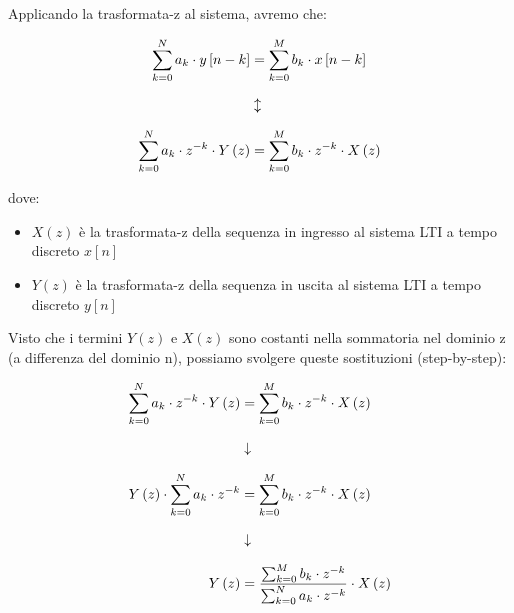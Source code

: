 Applicando la trasformata-z al sistema, avremo che: 

{
    \Large 
    \begin{equation}
        \setlength{\jot}{10pt} %
        \begin{split}
        \sum_{k = 0}^{N}
        a_k \cdot y \left[ n - k\right]
        &= 
        \sum_{k = 0}^{M}
        b_k \cdot x \left[ n - k\right]
        \\
        &\updownarrow
        \\
        \sum_{k = 0}^{N}
        a_k \cdot z^{-k} \cdot Y \left( z\right)
        &= 
        \sum_{k = 0}^{M}
        b_k \cdot z^{-k} \cdot X \left( z\right)
        \end{split}
    \end{equation}
}

dove: 

\begin{itemize}
    \item $X \left( z\right)$ è la trasformata-z della sequenza in ingresso al sistema LTI a tempo discreto $x \left[ n\right]$
    \item $Y \left( z\right)$ è la trasformata-z della sequenza in uscita al sistema LTI a tempo discreto $y \left[ n\right]$
\end{itemize} 

\newpage 

Visto che i termini $Y \left( z\right)$ e $X \left( z\right)$ sono costanti nella sommatoria nel dominio z (a differenza del dominio n), 
possiamo svolgere queste sostituzioni (step-by-step):

{
    \Large 
    \begin{equation}
        \setlength{\jot}{10pt} %
        \begin{split}
        \sum_{k = 0}^{N}
        a_k \cdot z^{-k} \cdot Y \left( z\right)
        &= 
        \sum_{k = 0}^{M}
        b_k \cdot z^{-k} \cdot X \left( z\right)
        \\
        &\downarrow
        \\
        Y \left( z\right) \cdot
        \sum_{k = 0}^{N}
        a_k \cdot z^{-k} 
        &= 
        \sum_{k = 0}^{M}
        b_k \cdot z^{-k} \cdot X \left( z\right)
        \\
        &\downarrow
        \\
        Y \left( z\right)
        &=
        \dfrac{\sum_{k = 0}^{M}
        b_k \cdot z^{-k}
        }{\sum_{k = 0}^{N}
        a_k \cdot z^{-k}}
        \cdot X \left( z\right)
        \end{split}
    \end{equation}
}

